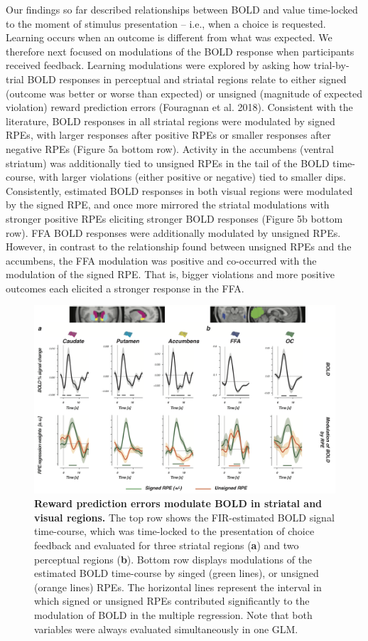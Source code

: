 \documentclass[]{article}
\begin{document}
Our findings so far described relationships between BOLD and value
time-locked to the moment of stimulus presentation -- i.e., when a
choice is requested. Learning occurs when an outcome is different from
what was expected. We therefore next focused on modulations of the BOLD
response when participants received feedback. Learning modulations were
explored by asking how trial-by-trial BOLD responses in perceptual and
striatal regions relate to either signed (outcome was better or worse
than expected) or unsigned (magnitude of expected violation) reward
prediction errors (Fouragnan et al. 2018). Consistent with the
literature, BOLD responses in all striatal regions were modulated by
signed RPEs, with larger responses after positive RPEs or smaller
responses after negative RPEs (Figure 5a bottom row). Activity in the
accumbens (ventral striatum) was additionally tied to unsigned RPEs in
the tail of the BOLD time-course, with larger violations (either
positive or negative) tied to smaller dips. Consistently, estimated BOLD
responses in both visual regions were modulated by the signed RPE, and
once more mirrored the striatal modulations with stronger positive RPEs
eliciting stronger BOLD responses (Figure 5b bottom row). FFA BOLD
responses were additionally modulated by unsigned RPEs. However, in
contrast to the relationship found between unsigned RPEs and the
accumbens, the FFA modulation was positive and co-occurred with the
modulation of the signed RPE. That is, bigger violations and more
positive outcomes each elicited a stronger response in the FFA.

\begin{figure}
\centering
\includegraphics{_png/Figure4.png}
\caption{\textbf{Reward prediction errors modulate BOLD in striatal and
visual regions.} The top row shows the FIR-estimated BOLD signal
time-course, which was time-locked to the presentation of choice
feedback and evaluated for three striatal regions (\textbf{a}) and two
perceptual regions (\textbf{b}). Bottom row displays modulations of the
estimated BOLD time-course by singed (green lines), or unsigned (orange
lines) RPEs. The horizontal lines represent the interval in which signed
or unsigned RPEs contributed significantly to the modulation of BOLD in
the multiple regression. Note that both variables were always evaluated
simultaneously in one GLM. \label{Figure 5}}
\end{figure}
\end{document}
